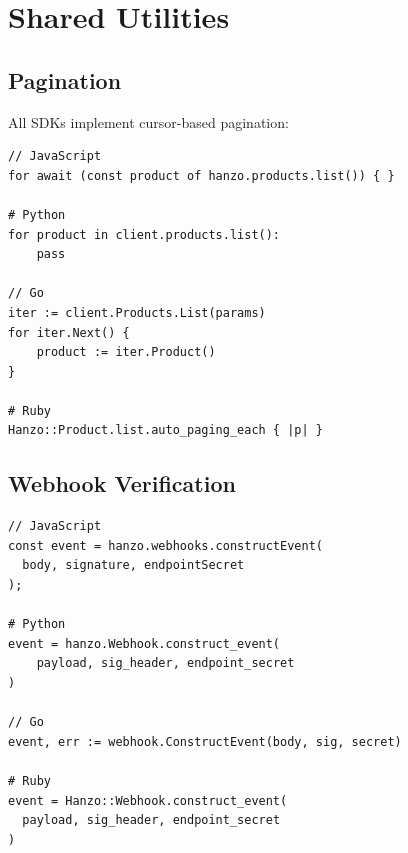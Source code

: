\section{Shared Utilities}


\subsection{Pagination}

All SDKs implement cursor-based pagination:

\begin{lstlisting}[caption=Pagination Pattern]
// JavaScript
for await (const product of hanzo.products.list()) { }

# Python
for product in client.products.list():
    pass

// Go
iter := client.Products.List(params)
for iter.Next() {
    product := iter.Product()
}

# Ruby
Hanzo::Product.list.auto_paging_each { |p| }
\end{lstlisting}

\subsection{Webhook Verification}

\begin{lstlisting}[caption=Webhook Verification]
// JavaScript
const event = hanzo.webhooks.constructEvent(
  body, signature, endpointSecret
);

# Python
event = hanzo.Webhook.construct_event(
    payload, sig_header, endpoint_secret
)

// Go
event, err := webhook.ConstructEvent(body, sig, secret)

# Ruby
event = Hanzo::Webhook.construct_event(
  payload, sig_header, endpoint_secret
)
\end{lstlisting}

